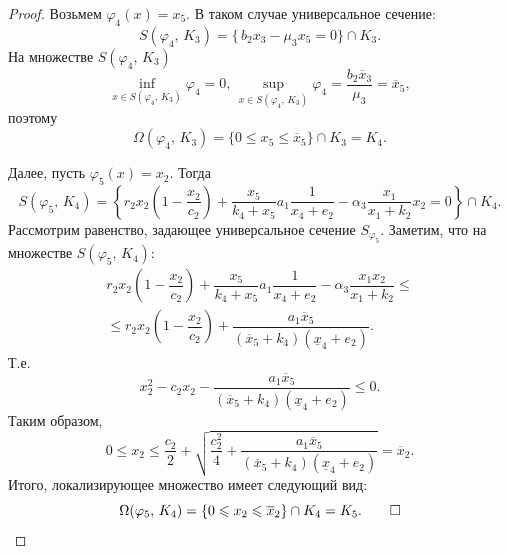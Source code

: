 \documentclass[14pt,a4paper]{extarticle}
\begin{document}
\begin{proof}
		Возьмем $\varphi_4(x)=x_5$. В таком случае универсальное сечение:
		\[S(\varphi_4,\, K_3)=\{\, b_2x_3-\mu_3x_5=0\}\cap K_3.\]
		На множестве $S(\varphi_4,\, K_3)$
		\[\inf\limits_{x\in S(\varphi_4,\, K_3)} \varphi_4=0,\, \sup\limits_{x\in S(\varphi_4,\, K_3)} \varphi_4=\dfrac{b_2\overline{x}_3}{\mu_3}=\overline{x}_5,\]
		поэтому 
		\[\Omega(\varphi_4,\, K_3) = \{0 \leqslant x_5 \leqslant \overline{x}_5\} \cap K_3 = K_4.\]
		
		Далее, пусть $\varphi_5(x)=x_2$. Тогда 
		\[S(\varphi_5,\, K_4)=\left\{r_2x_2\left(1-\dfrac{x_2}{c_2}\right)+\dfrac{x_5}{k_4+x_5}a_1\dfrac{1}{x_4+e_2}-\alpha_3\dfrac{x_1}{x_1+k_2}x_2=0\right\}\cap K_4.\]
		Рассмотрим равенство, задающее универсальное сечение $S_{\varphi_5}$. Заметим, что на множестве $S(\varphi_5,\, K_4)$:
		\begin{multline*}
			r_2x_2\left(1 - \dfrac{x_2}{c_2}\right) + \dfrac{x_5}{k_4+x_5}a_1\dfrac{1}{x_4+e_2} - \alpha_3\dfrac{x_1x_2}{x_1+k_2}\le\\
			\le r_2x_2\left(1-\dfrac{x_2}{c_2}\right) + \dfrac{a_1\overline{x}_5}{(\overline{x}_5+k_4)(\underline{x}_4+e_2)}.
		\end{multline*}
		Т.е.
		\[x_2^2-c_2x_2-\dfrac{a_1\overline{x}_5}{(\overline{x}_5+k_4)(\underline{x}_4+e_2)}\leqslant 0.\]
		Таким образом, 
		\[0 \leqslant x_2 \leqslant \dfrac{c_2}{2}+\sqrt{\dfrac{c_2^2}{4}+\dfrac{a_1\overline{x}_5}{(\overline{x}_5+k_4)(\underline{x}_4+e_2)}}=\overline{x}_2.\]
		Итого, локализирующее множество имеет следующий вид:
		\[\Omega(\varphi_5,\, K_4)=\{0\leqslant x_2 \leqslant \overline{x}_2\} \cap K_4 = K_5.\qed\]
	\end{proof}
	
\end{document}
